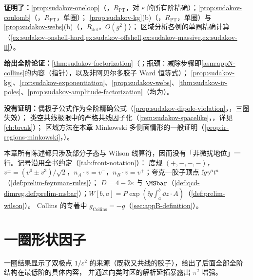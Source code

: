 \begin{tcolorbox}[enhanced,breakable,title=本章证明了什么／没有证明什么,fonttitle=\bfseries,
  colback=gray!3!white,colframe=gray!55!black,boxrule=0.6pt,arc=2pt,
  left=5pt,right=5pt,top=3pt,bottom=3pt,before skip=6pt,after skip=6pt]
\textbf{证明了：}\cref{prop:sudakov-oneloop}（\tagR，$R_{\mathrm{PT}}$，对 $\varepsilon$ 的所有阶精确）；\cref{prop:sudakov-coulomb}（\tagR，$R_{\mathrm{PT}}$，单圈）；
\cref{prop:sudakov-kg}(b)（\tagR，$R_{\mathrm{PT}}$，单圈）与\cref{prop:sudakov-webs}(b)（\tagR，$R_{\mathrm{def}}$，$O(g^2)$）；
区域分析各例的单圈精确计算（\cref{ex:sudakov-onshell-hard,ex:sudakov-offshell,ex:sudakov-massive,ex:sudakov-ll}）。\par
\textbf{给出全阶论证：}\cref{thm:sudakov-factorization}（\tagA；瓶颈：减除步骤即\cref{asm:appN-collins}的内容（指针），以及非阿贝尔多胶子 Ward 恒等式）；
\cref{prop:sudakov-kg}、\cref{cor:sudakov-exponentiation}、\cref{prop:sudakov-webs}、\cref{thm:sudakov-ir-poles}、\cref{prop:sudakov-amplitude-factorization}（均为\tagA）。\par
\textbf{没有证明：}偶极子公式作为全阶精确公式（\cref{prop:sudakov-dipole-violation}，\tagV，三圈失效）；
类空共线极限中的严格共线因子化（\cref{rem:sudakov-spacelike}，\tagV，详见\cref{ch:break}）；
区域方法在本章 Minkowski 多侧面情形的一般证明（\cref{prop:ir-regions-minkowski}，\tagP）。
\end{tcolorbox}

本章所有陈述都只涉及部分子态与 Wilson 线算符，因而没有「非微扰地位」一行。记号沿用全书约定（\cref{tab:front-notation}）：
度规 $(+,-,-,-)$，$v^\pm=(v^0\pm v^3)/\sqrt2$，$n_A\cdot v=v^-$，$n_B\cdot v=v^+$；夸克—胶子顶点 $\ii g\gamma^\mu t^a$（\cref{def:prelim-feynman-rules}）；
$D=4-2\varepsilon$ 与 $\MSbar$（\cref{def:qcd-dimreg,def:prelim-msbar}）；$W[b,a]=P\exp(\ii g\int_a^b\dd z\cdot A)$（\cref{def:prelim-wilson}）。
Collins 的专著\cite{Collins2011}中 $g_{\mathrm{Collins}}=-g$（\cref{sec:appB-definition}）。
\section{一圈形状因子}\label{sec:sudakov-oneloop}

一圈结果显示了双极点 $1/\varepsilon^2$ 的来源（既软又共线的胶子），给出了后面全部全阶结构在最低阶的具体内容，
并通过向类时区的解析延拓暴露出 $\pi^2$ 增强。

